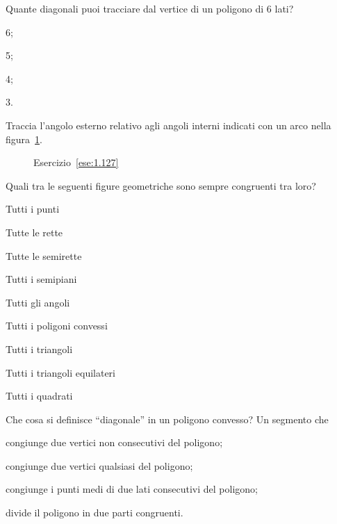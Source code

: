 \begin{esercizio}
\label{ese:1.126}
Quante diagonali puoi tracciare dal vertice di un poligono di 6 lati?
\begin{multicols}{4}
\begin{enumeratea}
\item 6;
\item 5;
\item 4;
\item 3.
\end{enumeratea}
\end{multicols}
\end{esercizio}

\begin{esercizio}
\label{ese:1.127}
Traccia l'angolo esterno relativo agli angoli interni indicati con un arco nella figura~\ref{fig:ese1.127}.
\end{esercizio}

\begin{figure}[htb]
 \centering
 \caption{Esercizio~\ref{ese:1.127}}\label{fig:ese1.127}
\end{figure}

\begin{esercizio}
\label{ese:1.128}
Quali tra le seguenti figure geometriche sono sempre congruenti tra loro?
\begin{multicols}{2}
\begin{enumeratea}
\item Tutti i punti				\tab\tab\boxV\quad\boxF
\item Tutte le rette				\tab\tab\boxV\quad\boxF
\item Tutte le semirette				\tab\boxV\quad\boxF
\item Tutti i semipiani				\tab\boxV\quad\boxF
\item Tutti gli angoli			\tab\tab\boxV\quad\boxF
\item Tutti i poligoni convessi		\tab\boxV\quad\boxF
\item Tutti i triangoli			\tab\tab\boxV\quad\boxF
\item Tutti i triangoli equilateri	\tab\boxV\quad\boxF
\item Tutti i quadrati			\tab\tab\boxV\quad\boxF
\end{enumeratea}
\end{multicols}
\end{esercizio}


\begin{esercizio}
\label{ese:1.129}
Che cosa si definisce ``diagonale'' in un poligono convesso? Un segmento che
\begin{enumeratea}
\item congiunge due vertici non consecutivi del poligono;
\item congiunge due vertici qualsiasi del poligono;
\item congiunge i punti medi di due lati consecutivi del poligono;
\item divide il poligono in due parti congruenti.
\end{enumeratea}
\end{esercizio}

